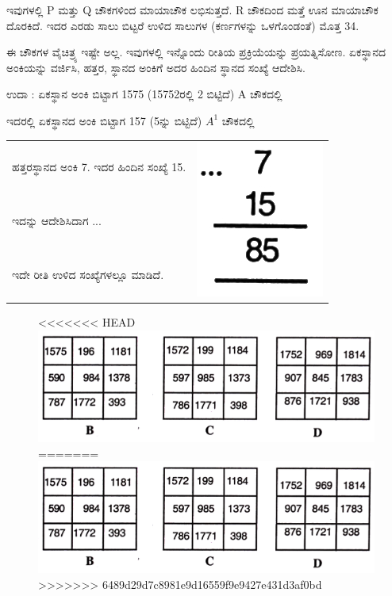 ಇವುಗಳಲ್ಲಿ P ಮತ್ತು Q ಚೌಕಗಳಿಂದ ಮಾಯಾಚೌಕ ಲಭಿಸುತ್ತದೆ. R ಚೌಕದಿಂದ ಮತ್ತೆ ಊನ ಮಾಯಾಚೌಕ ದೊರಕಿದೆ. ಇದರ ಎರಡು ಸಾಲು ಬಿಟ್ಟರೆ ಉಳಿದ ಸಾಲುಗಳ (ಕರ್ಣ\-ಗಳನ್ನು ಒಳಗೊಂಡಂತೆ) ಮೊತ್ತ 34.

ಈ ಚೌಕಗಳ ವೈಚಿತ್ರ್ಯ ಇಷ್ಟೇ ಅಲ್ಲ. ಇವುಗಳಲ್ಲಿ ಇನ್ನೊಂದು ರೀತಿಯ ಪ್ರಕ್ರಿಯೆಯನ್ನು ಪ್ರಯತ್ನಿಸೋಣ. ಏಕಸ್ಥಾನದ ಅಂಕಿಯನ್ನು ವರ್ಜಿಸಿ, ಹತ್ತರ, ಸ್ಥಾನದ ಅಂಕಿಗೆ ಅದರ ಹಿಂದಿನ ಸ್ಥಾನದ ಸಂಖ್ಯೆ ಆದೇಶಿಸಿ.

ಉದಾ : ಏಕಸ್ಥಾನ ಅಂಕಿ ಬಿಟ್ಟಾಗ 1575 (15752ರಲ್ಲಿ 2 ಬಿಟ್ಟಿದೆ) A ಚೌಕದಲ್ಲಿ

ಇದರಲ್ಲಿ ಏಕಸ್ಥಾನದ ಅಂಕಿ ಬಿಟ್ಟಾಗ 157 (5ನ್ನು ಬಿಟ್ಟಿದೆ) $A^1$ ಚೌಕದಲ್ಲಿ

\begin{tabular}{ll}
ಹತ್ತರಸ್ಥಾನದ ಅಂಕಿ 7. ಇದರ ಹಿಂದಿನ ಸಂಖ್ಯೆ 15. & \multirow{3}{2cm}{\includegraphics[scale=.8]{src/figures/chap7/fig7-33.jpg}}\\
ಇದನ್ನು ಆದೇಶಿಸಿದಾಗ ... & \\
ಇದೇ ರೀತಿ ಉಳಿದ ಸಂಖ್ಯೆಗಳಲ್ಲೂ ಮಾಡಿದೆ.
\end{tabular}

\begin{figure}[H]
<<<<<<< HEAD
\includegraphics{src/figures/chap7/fig7-13.jpg}
=======
\includegraphics[scale=0.85]{src/figures/chap7/fig7.13.jpg}
>>>>>>> 6489d29d7c8981e9d16559f9e9427e431d3af0bd
\end{figure}


